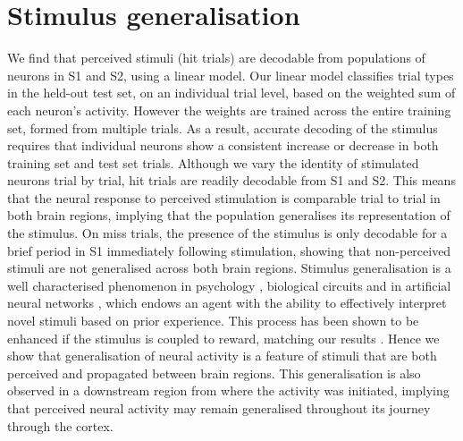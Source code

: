 \section{Stimulus generalisation}
We find that perceived stimuli (hit trials) are decodable from populations of neurons in S1 and S2, using a linear model. Our linear model classifies trial types in the held-out test set, on an individual trial level, based on the weighted sum of each neuron’s activity. However the weights are trained across the entire training set, formed from multiple trials. As a result, accurate decoding of the stimulus requires that individual neurons show a consistent increase or decrease in both training set and test set trials. Although we vary the identity of stimulated neurons trial by trial, hit trials are readily decodable from S1 and S2. This means that the neural response to perceived stimulation is comparable trial to trial in both brain regions, implying that the population generalises its representation of the stimulus. On miss trials, the presence of the stimulus is only decodable for a brief period in S1 immediately following stimulation, showing that non-perceived stimuli are not generalised across both brain regions. Stimulus generalisation is a well characterised phenomenon in psychology \cite{pavlov_conditioned_1927, pearce_model_1987}, biological circuits \cite{xu_neural_2013, henschke_reward_2020} and in artificial neural networks \cite{sietsma_creating_1991, jacot_neural_2018-1, summerfield_structure_2020}, which endows an agent with the ability to effectively interpret novel stimuli based on prior experience. This process has been shown to be enhanced if the stimulus is coupled to reward, matching our results \cite{henschke_reward_2020}. Hence we show that generalisation of neural activity is a feature of stimuli that are both perceived and propagated between brain regions. This generalisation is also observed in a downstream region from where the activity was initiated, implying that perceived neural activity may remain generalised throughout its journey through the cortex.

